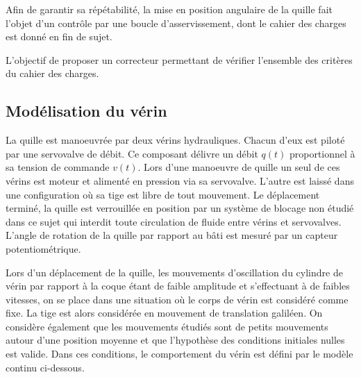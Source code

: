 Afin de garantir sa répétabilité, la mise en position angulaire de la quille fait l’objet d’un contrôle par une boucle d’asservissement, dont le cahier des charges est donné en fin de sujet.
%
\fi


\begin{obj}
L'objectif de proposer un correcteur permettant de vérifier l'ensemble des critères du cahier des charges. 

\end{obj}
\subsection*{Modélisation du vérin}

\ifprof
\else
La quille est manoeuvrée par deux vérins hydrauliques. Chacun d’eux est piloté par une servovalve de débit. Ce composant délivre un débit $q(t)$ proportionnel à sa tension de commande $v(t)$. Lors d’une manoeuvre de quille un seul de ces vérins est moteur et alimenté en pression via sa servovalve. L’autre est laissé dans une configuration où sa tige est libre de tout mouvement. Le déplacement terminé, la quille est verrouillée en position par un système de blocage non étudié dans ce sujet qui interdit toute circulation de fluide entre vérins et servovalves. L’angle de rotation de la quille par rapport au bâti est mesuré par un capteur potentiométrique.


Lors d’un déplacement de la quille, les mouvements d’oscillation du cylindre de vérin par rapport à la coque étant de faible amplitude et s’effectuant à de faibles vitesses, on se place dans une situation où le corps de vérin est considéré comme fixe. La tige est alors considérée en mouvement de translation galiléen.
On considère également que les mouvements étudiés sont de petits mouvements autour d’une position moyenne et que l’hypothèse des conditions initiales nulles est valide. Dans ces conditions, le comportement du vérin est défini par le modèle continu ci-dessous.


